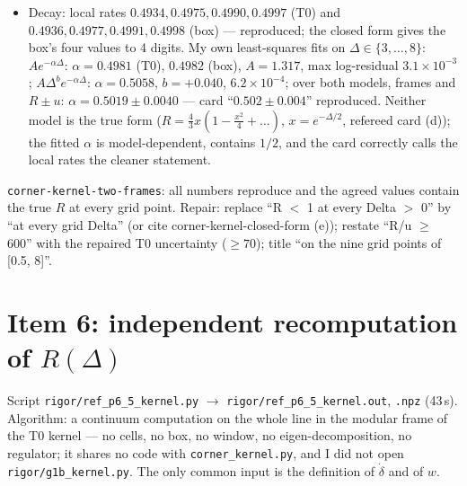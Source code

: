 \documentclass[11pt]{article}
\begin{document}
\begin{itemize}[leftmargin=*]
\texttt{corner-kernel-closed-form} (e), which the card may cite instead.) The title's ``on Delta in [0.5, 8]'' likewise
means nine grid points. [MINOR, wording; a claim beyond the data]
\item Decay: local rates $0.4934, 0.4975, 0.4990, 0.4997$ (T0) and $0.4936, 0.4977, 0.4991, 0.4998$ (box) --- reproduced; the
closed form gives the box's four values to 4 digits. My own least-squares fits on $\Delta\in\{3,\ldots,8\}$:
$Ae^{-\alpha\Delta}$: $\alpha=0.4981$ (T0), $0.4982$ (box), $A=1.317$, max log-residual $3.1\times10^{-3}$;
$A\Delta^be^{-\alpha\Delta}$: $\alpha=0.5058$, $b=+0.040$, $6.2\times10^{-4}$; over both models, frames and $R\pm u$:
$\alpha=0.5019\pm0.0040$ --- card ``$0.502\pm0.004$'' reproduced. Neither model is the true form
($R=\tfrac43x(1-\tfrac{x^2}4+\ldots)$, $x=e^{-\Delta/2}$, refereed card (d)); the fitted $\alpha$ is model-dependent, contains
$1/2$, and the card correctly calls the local rates the cleaner statement.
\end{itemize}
\begin{verdictgap}
\texttt{corner-kernel-two-frames}: all numbers reproduce and the agreed values contain the true $R$ at every grid point.
Repair: replace ``R $<$ 1 at every Delta $>$ 0'' by ``at every grid Delta'' (or cite corner-kernel-closed-form (e)); restate
``R/u $\ge$ 600'' with the repaired T0 uncertainty ($\ge70$); title ``on the nine grid points of [0.5, 8]''.
\end{verdictgap}

\section{Item 6: independent recomputation of $R(\Delta)$}
Script \texttt{rigor/ref\_p6\_5\_kernel.py} $\to$ \texttt{rigor/ref\_p6\_5\_kernel.out}, \texttt{.npz} (43\,s). Algorithm:
a continuum computation on the whole line in the modular frame of the T0 kernel --- no cells, no box, no window, no
eigen-decomposition, no regulator; it shares no code with \texttt{corner\_kernel.py}, and I did not open
\texttt{rigor/g1b\_kernel.py}. The only common input is the definition of $\dot\delta$ and of $w$.
\end{document}
